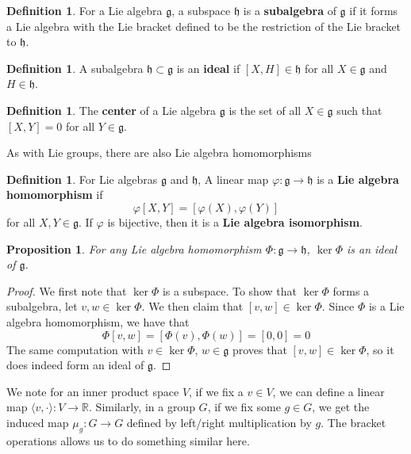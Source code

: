\documentclass[psamsfonts]{amsart}
\newtheorem{prop}[thm]{Proposition}
\theoremstyle{definition}
\newtheorem{defn}[thm]{Definition}
\theoremstyle{remark}
\newcommand{\R}{\mathbb{R}}
\newcommand{\g}{\mathfrak{g}}
\newcommand{\bra}[2]{ \left[ #1, #2 \right] }
\begin{document}
\begin{defn}
For a Lie algebra $\mathfrak{g}$, a subspace $\mathfrak{h}$ is a \textbf{subalgebra} of $\mathfrak{g}$ if it forms a Lie algebra with the Lie bracket defined to be the restriction of the Lie bracket to $\mathfrak{h}$.
\end{defn}

\begin{defn}
A subalgebra $\mathfrak{h} \subset \mathfrak{g}$ is an \textbf{ideal} if $\bra{X}{H} \in \mathfrak{h}$ for all $X \in \mathfrak{g}$ and $H \in \mathfrak{h}$.
\end{defn}

\begin{defn}
The \textbf{center} of a Lie algebra $\mathfrak{g}$ is the set of all $X \in \mathfrak{g}$ such that $\bra{X}{Y} = 0$ for all $Y \in \mathfrak{g}$.
\end{defn}

As with Lie groups, there are also Lie algebra homomorphisms
\begin{defn}
For Lie algebras $\mathfrak{g}$ and $\mathfrak{h}$, A linear map $\varphi: \mathfrak{g} \to \mathfrak{h}$ is a \textbf{Lie algebra homomorphism} if 
$$\varphi\bra{X}{Y} = \bra{\varphi(X)}{\varphi(Y)} $$
for all $X,Y \in \mathfrak{g}$. If $\varphi$ is bijective, then it is a \textbf{Lie algebra isomorphism}.
\end{defn}

\begin{prop}
For any Lie algebra homomorphism $\Phi: \g \to \mathfrak{h}$, $\ker \Phi$ is an ideal of $\g$.
\end{prop}

\begin{proof}
We first note that $\ker \Phi$ is a subspace. To show that $\ker \Phi$ forms a subalgebra, let $v,w \in \ker \Phi$. We then claim that $\bra{v}{w} \in \ker \Phi$. Since $\Phi$ is a Lie algebra homomorphism, we have that 
$$\Phi\bra{v}{w} = \bra{\Phi(v)}{\Phi(w)} = \bra{0}{0} = 0 $$
The same computation with $v \in \ker \Phi$, $w \in \g$ proves that $\bra{v}{w} \in \ker \Phi$, so it does indeed form an ideal of $\g$.
\end{proof}

We note for an inner product space $V$, if we fix a $v \in V$, we can define a linear map $\langle v, \cdot \rangle : V \to \R$. Similarly, in a group $G$, if we fix some $g \in G$, we get the induced map $\mu_g: G \to G$ defined by left/right multiplication by $g$. The bracket operations allows us to do something similar here. 
\end{document}
